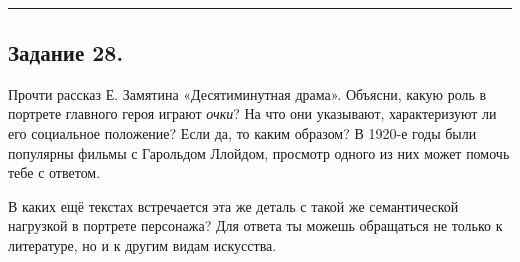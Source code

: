 \\
\rule[0.5\baselineskip]{\textwidth}{1pt}

\vspace{0\baselineskip}


\subsection*{Задание 28.}
    Прочти рассказ Е. Замятина «Десятиминутная драма». Объясни, какую роль в портрете главного героя играют \textit{очки}? На что они указывают, характеризуют ли его социальное положение? Если да, то каким образом? В 1920-е годы были популярны фильмы с Гарольдом Ллойдом, просмотр одного из них может помочь тебе с ответом.
    
    В каких ещё текстах встречается эта же деталь с такой же семантической нагрузкой в портрете персонажа? Для ответа ты можешь обращаться не только к литературе, но и к другим видам искусства.

